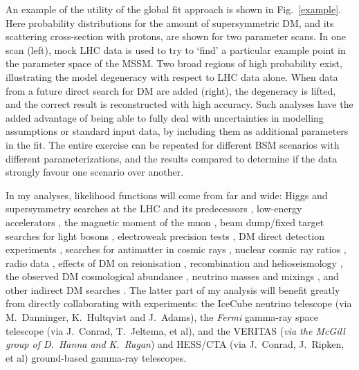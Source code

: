 \documentclass[10pt,oneside,twocolumn,a4paper]{article}
\begin{document}
An example of the utility of the global fit approach is shown in Fig.~\ref{example}.  Here probability distributions for the amount of supersymmetric DM, and its scattering cross-section with protons, are shown for two parameter scans.  In one scan (left), mock LHC data is used to try to `find' a particular example point in the parameter space of the MSSM.  Two broad regions of high probability exist, illustrating the model degeneracy with respect to LHC data alone.  When data from a future direct search for DM are added (right), the degeneracy is lifted, and the correct result is reconstructed with high accuracy.  Such analyses have the added advantage of being able to fully deal with uncertainties in modelling assumptions or standard input data, by including them as additional parameters in the fit.  The entire exercise can be repeated for different BSM scenarios with different parameterizations, and the results compared to determine if the data strongly favour one scenario over another.

In my analyses, likelihood functions will come from far and wide: Higgs and supersymmetry searches at the LHC and its predecessors \cite{ATLASHgammagamma11,ATLASSUSYljET11,CMSSUSYjET11a,CMSSUSYjET11b,ATLASmonojetET11}, low-energy accelerators \cite{HFAG07, CDFBmixinga, CDFBmixingb, CDFBmumu11}, the magnetic moment of the muon \cite{g-2}, beam dump/fixed target searches for light bosons \cite{Batell09,Bjorken09}, electroweak precision tests \cite{PDG}, DM direct detection experiments \cite{Bernabei08,CDMS2event,CDMSIILowE,XENON100,CoGeNTAnnMod11,CRESST11,SIMPLE11}, searches for antimatter in cosmic rays \cite{Pamelaantiproton10,Choutko02,Pamelaelectron11,Pamelapositron,AMSelectronpredict,Hailey09,Choutko08}, nuclear cosmic ray ratios \cite{CREAM1pHe}, radio data \cite{Regis08, Bergstrom09_MW}, effects of DM on reionisation \cite{Natarajan10,Cirelli09b}, recombination \cite{Slatyer09, Galli09} and helioseismology \cite{Taoso10}, the observed DM cosmological abundance \cite{WMAP7}, neutrino masses and mixings \cite{Schwetz11,Akhmedov10,Hamann10}, and other indirect DM searches \cite{IceCube09,Scott09c,LATcosmowimp,LATDwarfComposite,HESSdwarfs, MAGICSegue, VERITAS10}.  The latter part of my analysis will benefit greatly from directly collaborating with experiments: the IceCube neutrino telescope (via M.~Danninger, K.~Hultqvist and J.~Adams), the \emph{Fermi} gamma-ray space telescope (via J.~Conrad, T.~Jeltema, et al), and the VERITAS (\textit{via the McGill group of D.~Hanna and K.~Ragan}) and HESS/CTA (via J.~Conrad, J.~Ripken, et al) ground-based gamma-ray telescopes.
\end{document}
